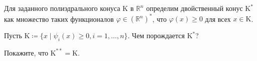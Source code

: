 Для заданного полиэдрального конуса $\mathrm{K}$ в $\mathbb{R}^n$ определим двойственный конус
$\mathrm{K}^*$ как множество таких функционалов $\varphi \in (\mathbb{R}^n)^*$, что $\varphi(x) \ge 0$
для всех $x \in \mathrm{K}$.
\begin{enumcyr}
    \item Пусть $\mathrm{K} \coloneqq \{x \mid \psi_i(x) \ge 0, i = 1, \dots, n\}$. Чем порождается
        $\mathrm{K}^*$?
    \item Покажите, что $\mathrm{K}^{**} = \mathrm{K}$.
\end{enumcyr}